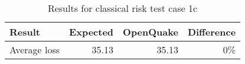 \begin{table}[htbp]

\centering
\begin{tabular}{ l r r r }

\hline
\rowcolor{anti-flashwhite}
\bf{Result} & \bf{Expected} & \bf{OpenQuake} & \bf{Difference}\\
\hline
Average loss & 35.13 & 35.13 & 0\% \\
\hline
\end{tabular}

\caption{Results for classical risk test case 1c}
\label{tab:result-cr-1c}
\end{table}